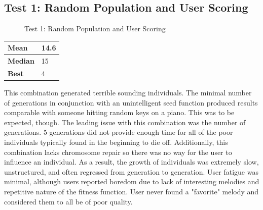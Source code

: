 \documentclass[12pt]{article} %
\begin{document}
\subsection{Test 1: Random Population and User Scoring}
\begin{figure}[H]
\caption{Test 1: Random Population and User Scoring}
\label{fig:test1}
\end{figure}
\begin{center}
	 \label{tab:stats_t1} 
    \begin{tabular}{|l|l|}
        \hline
	\bf{Mean}         & 14.6\\ \hline
	\bf{Median}         & 15 \\ \hline
	\bf{Best} & 4\\ \hline 
    \end{tabular}
\end{center}
This combination generated terrible sounding individuals. The minimal number of generations in conjunction with an unintelligent seed function produced results comparable with someone hitting random keys on a piano. This was to be expected, though. The leading issue with this combination was the number of generations. 5 generations did not provide enough time for all of the poor individuals typically found in the beginning to die off. Additionally, this combination lacks chromosome repair so there was no way for the user to influence an individual. As a result, the growth of individuals was extremely slow, unstructured, and often regressed from generation to generation. User fatigue was minimal, although users reported boredom due to lack of interesting melodies and repetitive nature of the fitness function. User never found a "favorite" melody and considered them to all be of poor quality. \\
\end{document}
